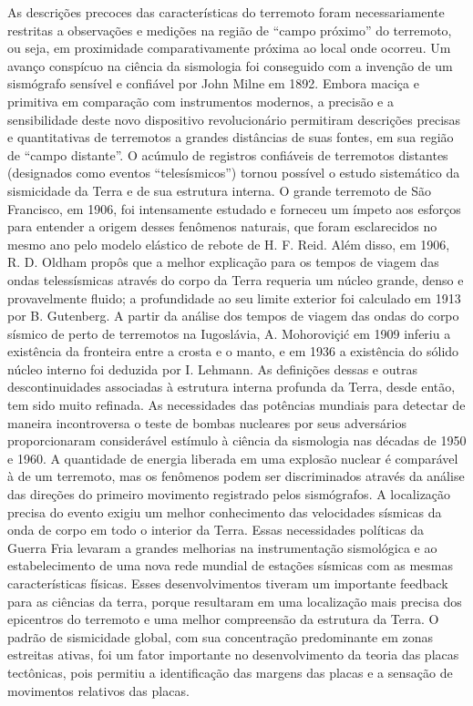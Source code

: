 \documentclass[]{book}
\theoremstyle{definition}
\theoremstyle{definition}
\theoremstyle{definition}
\theoremstyle{remark}
\begin{document}
As descrições precoces das características do terremoto foram necessariamente restritas a observações e medições na região de ``campo próximo'' do terremoto, ou seja, em proximidade comparativamente próxima ao local onde ocorreu. Um avanço conspícuo na ciência da sismologia foi conseguido com a invenção de um sismógrafo sensível e confiável por John Milne em 1892. Embora maciça e primitiva em comparação com instrumentos modernos, a precisão e a sensibilidade deste novo dispositivo revolucionário permitiram descrições precisas e quantitativas de terremotos a grandes distâncias de suas fontes, em sua região de ``campo distante''. O acúmulo de registros confiáveis de terremotos distantes (designados como eventos ``telesísmicos'') tornou possível o estudo sistemático da sismicidade da Terra e de sua estrutura interna. O grande terremoto de São Francisco, em 1906, foi intensamente estudado e forneceu um ímpeto aos esforços para entender a origem desses fenômenos naturais, que foram esclarecidos no mesmo ano pelo modelo elástico de rebote de H. F. Reid. Além disso, em 1906, R. D. Oldham propôs que a melhor explicação para os tempos de viagem das ondas telessísmicas através do corpo da Terra requeria um núcleo grande, denso e provavelmente fluido; a profundidade ao seu limite exterior foi calculado em 1913 por B. Gutenberg. A partir da análise dos tempos de viagem das ondas do corpo sísmico de perto de terremotos na Iugoslávia, A. Mohoroviçić em 1909 inferiu a existência da fronteira entre a crosta e o manto, e em 1936 a existência do sólido núcleo interno foi deduzida por I. Lehmann. As definições dessas e outras descontinuidades associadas à estrutura interna profunda da Terra, desde então, tem sido muito refinada.
As necessidades das potências mundiais para detectar de maneira incontroversa o teste de bombas nucleares por seus adversários proporcionaram considerável estímulo à ciência da sismologia nas décadas de 1950 e 1960. A quantidade de energia liberada em uma explosão nuclear é comparável à de um terremoto, mas os fenômenos podem ser discriminados através da análise das direções do primeiro movimento registrado pelos sismógrafos. A localização precisa do evento exigiu um melhor conhecimento das velocidades sísmicas da onda de corpo em todo o interior da Terra. Essas necessidades políticas da Guerra Fria levaram a grandes melhorias na instrumentação sismológica e ao estabelecimento de uma nova rede mundial de estações sísmicas com as mesmas características físicas.
Esses desenvolvimentos tiveram um importante feedback para as ciências da terra, porque resultaram em uma localização mais precisa dos epicentros do terremoto e uma melhor compreensão da estrutura da Terra. O padrão de sismicidade global, com sua concentração predominante em zonas estreitas ativas, foi um fator importante no desenvolvimento da teoria das placas tectônicas, pois permitiu a identificação das margens das placas e a sensação de movimentos relativos das placas.
\end{document}
